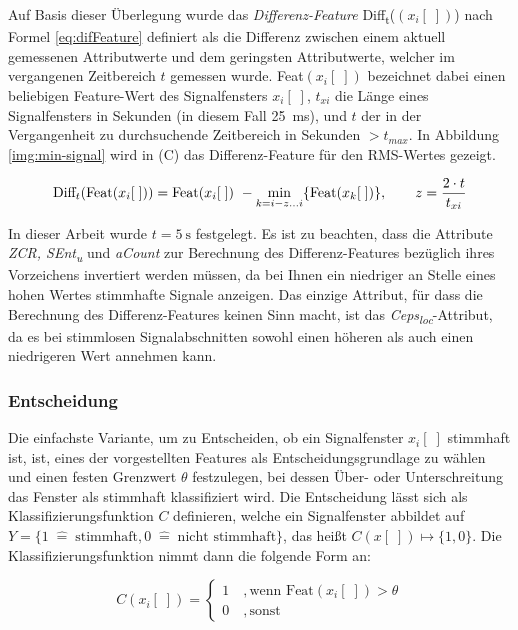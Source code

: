 Auf Basis dieser Überlegung wurde das \emph{Differenz-Feature} Diff\textsubscript{t}($(x_i[\;])$) nach Formel \ref{eq:difFeature} definiert als die Differenz zwischen einem aktuell gemessenen Attributwerte und dem geringsten Attributwerte, welcher im vergangenen Zeitbereich $t$ gemessen wurde. Feat$(x_i[\;])$ bezeichnet dabei einen beliebigen Feature-Wert des Signalfensters $x_i[\;]$, $t_{xi}$ die Länge eines Signalfensters in Sekunden (in diesem Fall \SI{25}{\milli\second}), und $t$ der in der Vergangenheit zu durchsuchende Zeitbereich in Sekunden $> t_{max}$. In Abbildung \ref{img:min-signal} wird in (C) das Differenz-Feature für den RMS-Wertes gezeigt.

\begin{equation}
\text{Diff}_t(\text{Feat}(x_i[\;])) = \text{Feat}(x_i[\;])\ - \operatorname*{min}_{k=i-z...i}\{\text{Feat}(x_k[\;])\}, \qquad z = \frac{2 \cdot t}{t_{xi}}
\label{eq:difFeature}
\end{equation}

In dieser Arbeit wurde $t = \SI{5}{\second}$ festgelegt. Es ist zu beachten, dass die Attribute \emph{ZCR, SEnt\textsubscript{u}} und \emph{aCount} zur Berechnung des Differenz-Features bezüglich ihres Vorzeichens invertiert werden müssen, da bei Ihnen ein niedriger an Stelle eines hohen Wertes stimmhafte Signale anzeigen. Das einzige Attribut, für dass die Berechnung des Differenz-Features keinen Sinn macht, ist das \emph{Ceps\textsubscript{loc}}-Attribut, da es bei stimmlosen Signalabschnitten sowohl einen höheren als auch einen niedrigeren Wert annehmen kann.

\subsubsection{Entscheidung}

Die einfachste Variante, um zu Entscheiden, ob ein Signalfenster $x_i[\;]$ stimmhaft ist, ist, eines der vorgestellten Features als Entscheidungsgrundlage zu wählen und einen festen Grenzwert $\theta$ festzulegen, bei dessen Über- oder Unterschreitung das Fenster als stimmhaft klassifiziert wird. Die Entscheidung lässt sich als Klassifizierungsfunktion $C$ definieren, welche ein Signalfenster abbildet auf $Y = \{ 1 \; \hat{=} \; \text{stimmhaft}, 0 \; \hat{=} \; \text{nicht stimmhaft}\}$, das heißt $C(x[\;]) \mapsto \{1,0\}$. Die Klassifizierungsfunktion nimmt dann die folgende Form an:

\begin{equation}
	C(x_i[\;]) = 
\begin{cases}
1 \quad , \text{wenn Feat}(x_i[\;]) > \theta \\
0 \quad , \text{sonst}
 \end{cases}
\end{equation}

